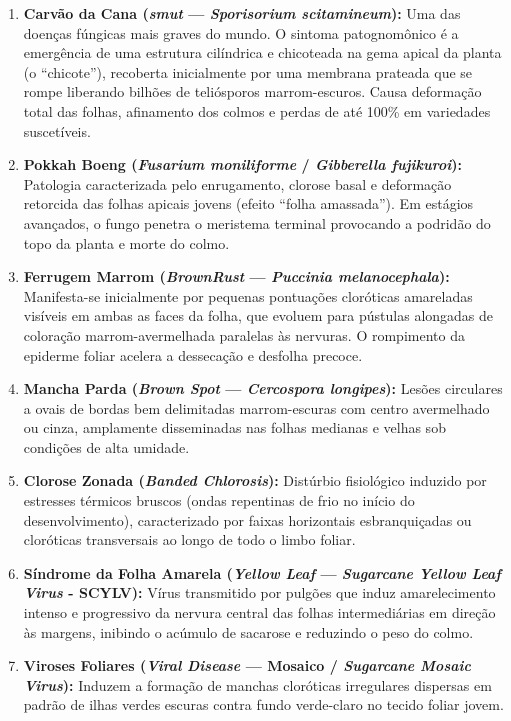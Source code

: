 \begin{enumerate}
    \item \textbf{Carvão da Cana (\textit{smut} — \textit{Sporisorium scitamineum}):} Uma das doenças fúngicas mais graves do mundo. O sintoma patognomônico é a emergência de uma estrutura cilíndrica e chicoteada na gema apical da planta (o ``chicote''), recoberta inicialmente por uma membrana prateada que se rompe liberando bilhões de teliósporos marrom-escuros. Causa deformação total das folhas, afinamento dos colmos e perdas de até 100\% em variedades suscetíveis.
    \item \textbf{Pokkah Boeng (\textit{Fusarium moniliforme} / \textit{Gibberella fujikuroi}):} Patologia caracterizada pelo enrugamento, clorose basal e deformação retorcida das folhas apicais jovens (efeito ``folha amassada''). Em estágios avançados, o fungo penetra o meristema terminal provocando a podridão do topo da planta e morte do colmo.
    \item \textbf{Ferrugem Marrom (\textit{BrownRust} — \textit{Puccinia melanocephala}):} Manifesta-se inicialmente por pequenas pontuações cloróticas amareladas visíveis em ambas as faces da folha, que evoluem para pústulas alongadas de coloração marrom-avermelhada paralelas às nervuras. O rompimento da epiderme foliar acelera a dessecação e desfolha precoce.
    \item \textbf{Mancha Parda (\textit{Brown Spot} — \textit{Cercospora longipes}):} Lesões circulares a ovais de bordas bem delimitadas marrom-escuras com centro avermelhado ou cinza, amplamente disseminadas nas folhas medianas e velhas sob condições de alta umidade.
    \item \textbf{Clorose Zonada (\textit{Banded Chlorosis}):} Distúrbio fisiológico induzido por estresses térmicos bruscos (ondas repentinas de frio no início do desenvolvimento), caracterizado por faixas horizontais esbranquiçadas ou cloróticas transversais ao longo de todo o limbo foliar.
    \item \textbf{Síndrome da Folha Amarela (\textit{Yellow Leaf} — \textit{Sugarcane Yellow Leaf Virus} - SCYLV):} Vírus transmitido por pulgões que induz amarelecimento intenso e progressivo da nervura central das folhas intermediárias em direção às margens, inibindo o acúmulo de sacarose e reduzindo o peso do colmo.
    \item \textbf{Viroses Foliares (\textit{Viral Disease} — Mosaico / \textit{Sugarcane Mosaic Virus}):} Induzem a formação de manchas cloróticas irregulares dispersas em padrão de ilhas verdes escuras contra fundo verde-claro no tecido foliar jovem.

\end{enumerate}
